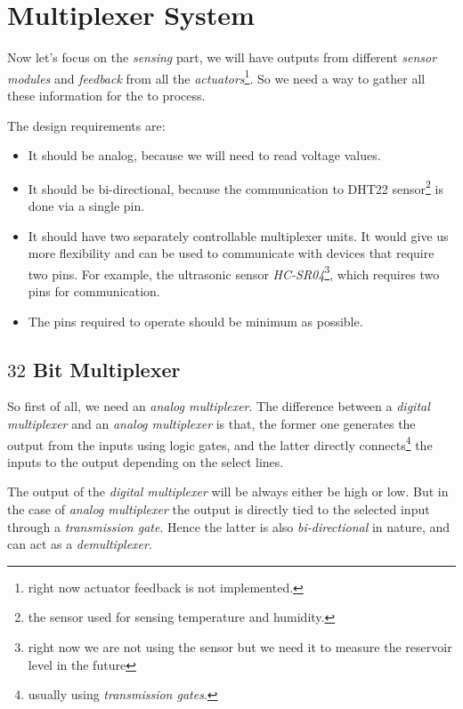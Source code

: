 \documentclass[../../main]{subfiles}
\begin{document}
\section{Multiplexer System} \label{sec:}

Now let's focus on the \emph{sensing} part, we will have outputs from different
\emph{sensor modules} and \emph{feedback} from all the \emph{actuators}\footnote{right now
actuator feedback is not implemented.}. So we need a way to gather all these information
for the \esp to process.

The design requirements are:

\begin{itemize}
    \item It should be analog, because we will need to read voltage values.
    \item It should be bi-directional, because the communication to DHT22 sensor\footnote{the
        sensor used for sensing temperature and humidity.} is done via a single pin.
    \item It should have two separately controllable multiplexer units. It would give us
        more flexibility and can be used to communicate with devices that require two
        pins. For example, the ultrasonic sensor \emph{HC-SR04}\footnote{right now we are
        not using the sensor but we need it to measure the reservoir level in the future},
        which requires two pins for communication.
    \item The pins required to operate should be minimum as possible.
\end{itemize}

\subsection{$32$ Bit Multiplexer}

So first of all, we need an \emph{analog multiplexer}. The difference between a \emph{digital
multiplexer} and an \emph{analog multiplexer} is that, the former one generates the output
from the inputs using logic gates, and the latter directly connects\footnote{usually using
\emph{transmission gates}.} the inputs to the output depending on the select lines.

The output of the \emph{digital multiplexer} will be always either be high or low. But in
the case of \emph{analog multiplexer} the output is directly tied to the selected input
through a \emph{transmission gate}. Hence the latter is also \emph{bi-directional} in nature,
and can act as a \emph{demultiplexer}.
\end{document}
